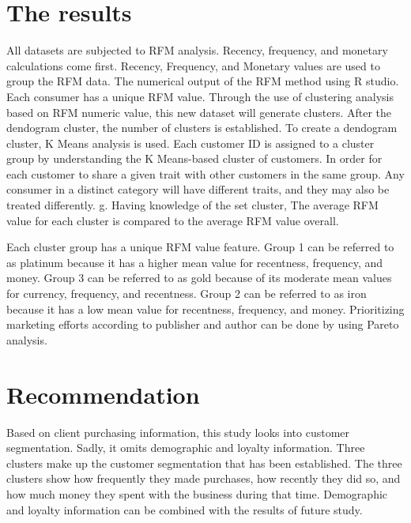 \documentclass[a4paper]{article}
\begin{document}
\section{The results}
 
All datasets are subjected to RFM analysis. Recency, frequency, and monetary calculations come first. Recency, Frequency, and Monetary values are used to group the RFM data. The numerical output of the RFM method using R studio. Each consumer has a unique RFM value. Through the use of clustering analysis based on RFM numeric value, this new dataset will generate clusters. After the dendogram cluster, the number of clusters is established. To create a dendogram cluster, K Means analysis is used. Each customer ID is assigned to a cluster group by understanding the K Means-based cluster of customers. In order for each customer to share a given trait with other customers in the same group. Any consumer in a distinct category will have different traits, and they may also be treated differently. g. Having knowledge of the set cluster, The average RFM value for each cluster is compared to the average RFM value overall. 

Each cluster group has a unique RFM value feature. Group 1 can be referred to as platinum because it has a higher mean value for recentness, frequency, and money. Group 3 can be referred to as gold because of its moderate mean values for currency, frequency, and recentness. Group 2 can be referred to as iron because it has a low mean value for recentness, frequency, and money. Prioritizing marketing efforts according to publisher and author can be done by using Pareto analysis.

\section{Recommendation}

Based on client purchasing information, this study looks into customer segmentation. Sadly, it omits demographic and loyalty information. Three clusters make up the customer segmentation that has been established. The three clusters show how frequently they made purchases, how recently they did so, and how much money they spent with the business during that time. Demographic and loyalty information can be combined with the results of future study.
\end{document}
